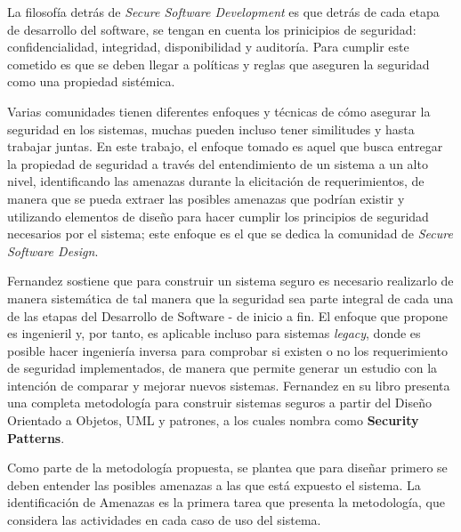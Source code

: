 La filosofía detrás de \textit{Secure Software Development} es que detrás de cada etapa de desarrollo del software, se tengan en cuenta los prinicipios de seguridad: confidencialidad, integridad, disponibilidad y auditoría. Para cumplir este cometido es que se deben llegar a políticas y reglas que aseguren la seguridad como una propiedad sistémica.

Varias comunidades tienen diferentes enfoques y técnicas de cómo asegurar la seguridad en los sistemas, muchas pueden incluso tener similitudes y hasta trabajar juntas. En este trabajo, el enfoque tomado es aquel que busca entregar la propiedad de seguridad a través del entendimiento de un sistema a un alto nivel, identificando las amenazas durante la elicitación de requerimientos, de manera que se pueda extraer las posibles amenazas que podrían existir y utilizando elementos de diseño para hacer cumplir los principios de seguridad necesarios por el sistema; este enfoque es el que se dedica la comunidad de \textit{Secure Software Design}. 

Fernandez \cite{Fernandez2011a,fernandez2013security} sostiene que para construir un sistema seguro es necesario realizarlo de manera sistemática de tal manera que la seguridad sea parte integral de cada una de las etapas del Desarrollo de Software - de inicio a fin. El enfoque que propone es ingenieril y, por tanto, es aplicable incluso para sistemas \textit{legacy}, donde es posible hacer ingeniería inversa para comprobar si existen o no los requerimiento de seguridad implementados, de manera que permite generar un estudio con la intención de comparar y mejorar nuevos sistemas. Fernandez en su libro \cite{fernandez2013security} presenta una completa metodología para construir sistemas seguros a partir del Diseño Orientado a Objetos, UML y patrones, a los cuales nombra como \textbf{Security Patterns}.

Como parte de la metodología propuesta, se plantea que para diseñar primero se deben entender las posibles amenazas a las que está expuesto el sistema. La identificación de Amenazas \cite{braz2008eliciting,fernandez2006defining} es la primera tarea que presenta la metodología, que considera las actividades en cada caso de uso del sistema.


